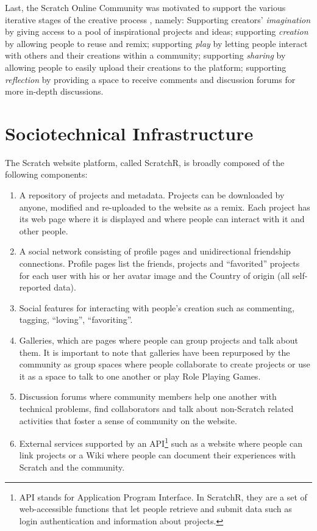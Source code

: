 Last, the Scratch Online Community was motivated to support the various iterative stages of the creative process \citep{resnick_sowing_2008}, namely:
Supporting creators' \emph{imagination} by giving access to a pool of inspirational projects and ideas; supporting \emph{creation} by allowing people to reuse and remix; supporting \emph{play} by letting people interact with others and their creations within a community; supporting \emph{sharing} by allowing people to easily upload their creations to the platform; supporting \emph{reflection} by providing a space to receive comments and discussion forums for more in-depth discussions.

\section{Sociotechnical Infrastructure}
The Scratch website platform, called ScratchR, is broadly composed of the following components: 

\begin{enumerate}
\item A repository of projects and metadata. Projects can be downloaded by anyone, modified and re-uploaded to the website as a remix. Each project has its web page where it is displayed and where people can interact with it and other people. 

\item A social network consisting of profile pages and unidirectional friendship connections. Profile pages list the friends, projects and ``favorited'' projects for each user with his or her avatar image and the Country of origin (all self-reported data).

\item Social features for interacting with people's creation such as commenting, tagging, ``loving'', ``favoriting''.

\item Galleries, which are pages where people can group projects and talk about them. It is important to note that galleries have been repurposed by the community as group spaces where people collaborate to create projects or use it as a space to talk to one another or play Role Playing Games.

\item Discussion forums where community members help one another with technical problems, find collaborators and talk about non-Scratch related activities that foster a sense of community on the website.

\item External services supported by an API\footnote{API stands for Application Program Interface. In ScratchR, they are a set of web-accessible functions that let people retrieve and submit data such as login authentication and information about projects.} such as a website where people can link projects or a Wiki where people can document their experiences with Scratch and the community.
\end{enumerate}

